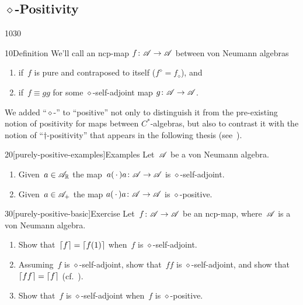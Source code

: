 \subsection{\texorpdfstring{$\diamond$-P}{Diamond p}ositivity}
\begin{parsec}{1030}%
\begin{point}{10}{Definition}%
We'll call an ncp-map $f\colon \mathscr{A}\to\mathscr{A}$
between von Neumann algebras
\begin{enumerate}
\item
{}%
if~$f$ is pure and contraposed to itself
($f^\diamond = f_\diamond$), and
\item
{}%
if~$f\equiv gg$
for some $\diamond$-self-adjoint map
$g\colon \mathscr{A}\to\mathscr{A}$.
\end{enumerate}
We added ``$\diamond$-'' to ``positive''
not only to distinguish it from 
the pre-existing notion of positivity for maps between $C^*$-algebras,
but also to contrast it with
	the notion of ``$\dagger$-positivity''
	that appears in the following thesis (see~).
\end{point}
\begin{point}{20}[purely-positive-examples]{Examples}%
Let~$\mathscr{A}$ be a von Neumann algebra.
\begin{enumerate}
\item
Given~$a\in\mathscr{A}_{\mathbb{R}}$ the map~$a(\,\cdot\,)a\colon \mathscr{A}\to\mathscr{A}$ is 
$\diamond$-self-adjoint.
\item
Given~$a\in\mathscr{A}_+$
the map $a(\,\cdot\,)a\colon \mathscr{A}\to\mathscr{A}$
is $\diamond$-positive.
\end{enumerate}
\spacingfix
\end{point}%
\begin{point}{30}[purely-positive-basic]{Exercise}%
Let~$f\colon \mathscr{A}\to\mathscr{A}$
be an ncp-map,
where~$\mathscr{A}$ is a von Neumann algebra.
\begin{enumerate}
\item
Show that~$\left\lceil f\right\rceil=\left\lceil f(1)\right\rceil$ when~$f$
is  $\diamond$-self-adjoint.
\item
Assuming~$f$ is $\diamond$-self-adjoint,
show that~$ff$ is $\diamond$-self-adjoint,
and show that~$\left\lceil ff\right\rceil=\left\lceil f\right\rceil$ (cf.~).
\item
Show that~$f$ is $\diamond$-self-adjoint
when~$f$ is $\diamond$-positive.
\end{enumerate}
\spacingfix%
\end{point}
\end{parsec}

